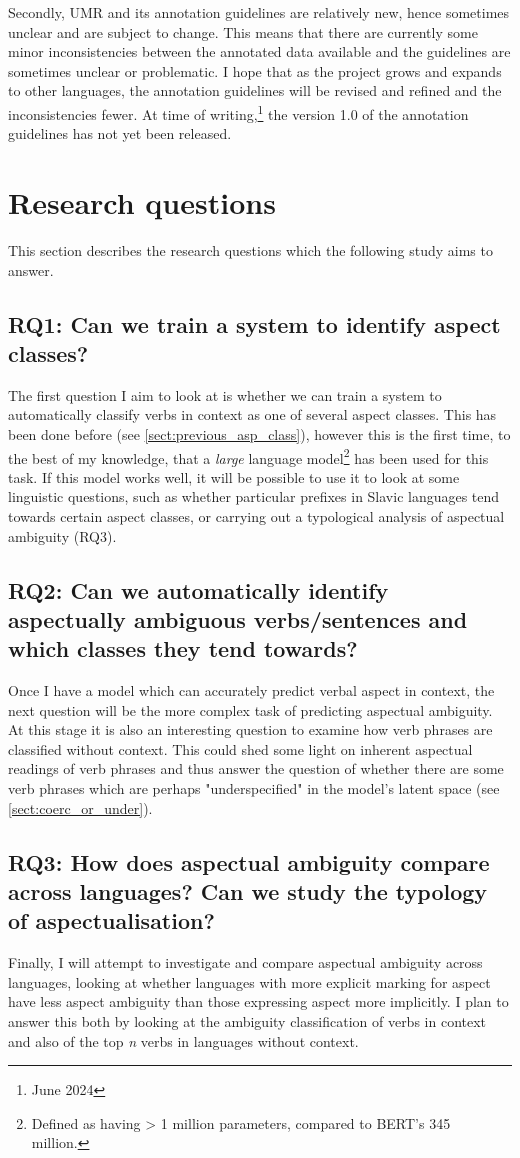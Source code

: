Secondly, UMR and its annotation guidelines are relatively new, hence sometimes unclear and are subject to change. This means that there are currently some minor inconsistencies between the annotated data available and the guidelines are sometimes unclear or problematic. I hope that as the project grows and expands to other languages, the annotation guidelines will be revised and refined and the inconsistencies fewer. At time of writing,\footnote{June 2024} the version 1.0 of the annotation guidelines has not yet been released.
\section{Research questions}
This section describes the research questions which the following study aims to answer.
\subsection*{RQ1: Can we train a system to identify aspect classes?}
The first question I aim to look at is whether we can train a system to automatically classify verbs in context as one of several aspect classes. This has been done before (see \ref{sect:previous_asp_class}), however this is the first time, to the best of my knowledge, that a \emph{large} language model\footnote{Defined as having > 1 million parameters, compared to BERT's 345 million.} has been used for this task. If this model works well, it will be possible to use it to look at some linguistic questions, such as whether particular prefixes in Slavic languages tend towards certain aspect classes, or carrying out a typological analysis of aspectual ambiguity (RQ3). 
\subsection*{RQ2: Can we automatically identify aspectually ambiguous verbs/sentences and which classes they tend towards?}
Once I have a model which can accurately predict verbal aspect in context, the next question will be the more complex task of predicting aspectual ambiguity. At this stage it is also an interesting question to examine how verb phrases are classified without context. This could shed some light on inherent aspectual readings of verb phrases and thus answer the question of whether there are some verb phrases which are perhaps "underspecified" in the model's latent space (see \ref{sect:coerc_or_under}).
\subsection*{RQ3: How does aspectual ambiguity compare across languages? Can we study the typology of aspectualisation?}
Finally, I will attempt to investigate and compare aspectual ambiguity across languages, looking at whether languages with more explicit marking for aspect have less aspect ambiguity than those expressing aspect more implicitly. I plan to answer this both by looking at the ambiguity classification of verbs in context and also of the top \emph{n} verbs in languages without context.
